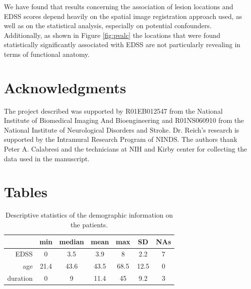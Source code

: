 \documentclass[10pt]{article}
\begin{document}
We have found that results concerning the association of lesion locations and EDSS scores depend  heavily on the spatial image registration approach used, as well as on the statistical analysis, especially on potential confounders. Additionally, as shown in Figure \ref{fig:pvalc} the locations that were found statistically significantly associated with EDSS  are not particularly revealing in terms of functional anatomy. 



\section*{Acknowledgments}

The project described was supported by R01EB012547 from the National Institute of Biomedical Imaging And Bioengineering and R01NS060910 from the National Institute of Neurological Disorders and Stroke. Dr. Reich's research is supported by the Intramural Research Program of NINDS. The authors thank Peter A. Calabresi and the technicians at NIH and Kirby center for collecting the data used in the manuscript. 


\newpage




\newpage

\section*{Tables}

\begin{table}[ht!]
\begin{center}
\caption{Descriptive statistics of the demographic information on the patients.}\label{t:dem}
\begin{tabular}{rcccccc}
& min & median & mean & max & SD & NAs \\
\hline
EDSS & 0  &   3.5  &  3.9 &    8 & 2.2 & 7 \\
age & 21.4 & 43.6 & 43.5 & 68.5 & 12.5 & 0 \\
duration & 0  &   9  &  11.4 &   45 & 9.2 & 3\\
\end{tabular} \\
\end{center}
\end{table}
\end{document}
